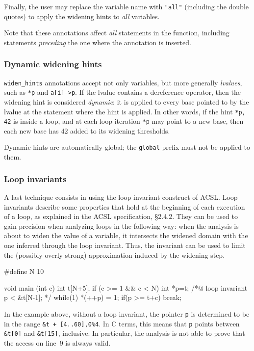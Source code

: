 \documentclass{frama-c-book}
\begin{document}
Finally, the user may replace the variable name with \lstinline|"all"|
(including the double quotes) to apply the widening hints to {\em all} variables.

Note that these annotations affect {\em all} statements in the function,
including statements {\em preceding} the one where the annotation is inserted.

\subsubsection*{Dynamic widening hints}

\lstinline|widen_hints| annotations accept not only variables, but more
generally \emph{lvalues}, such as \lstinline|*p| and \lstinline|a[i]->p|.
If the lvalue contains a dereference operator, then the widening hint is
considered \emph{dynamic}: it is applied to every base pointed to by the lvalue
at the statement where the hint is applied. In other words, if the hint
\lstinline|*p, 42| is inside a loop, and at each loop iteration \lstinline|*p|
may point to a new base, then each new base has 42 added to its widening
thresholds.

Dynamic hints are automatically global; the \lstinline|global| prefix must not
be applied to them.

\subsubsection{Loop invariants}

A last technique consists in using the loop invariant construct of ACSL.
Loop invariants describe some
properties that hold at the beginning of each execution of a loop,
as explained in the ACSL specification, \S2.4.2.
%
They can be used to gain precision when analyzing loops in
the following way: when the analysis is about to widen the value of a
variable, it intersects the widened domain with the one inferred through
the loop invariant. Thus, the invariant can be used to limit the
(possibly overly strong) approximation induced by the widening step.

\begin{listing}{1}
#define N 10

void main (int c)
{
  int t[N+5];
  if (c >= 1 && c < N)
  {
    int *p=t;
    /*@ loop invariant p < &t[N-1]; */
    while(1)
    {
      *(++p) = 1;
      if(p >= t+c)
        break;
    }
  }
}
\end{listing}
In the example above, without a loop invariant, the pointer \lstinline+p+
is determined to be in the range \lstinline|&t + [4..60],0%4|. In C terms, this
means that \lstinline+p+ points between \lstinline+&t[0]+
and \lstinline+&t[15]+, inclusive. In particular, the analysis is not able
to prove that the access on line~9 is always valid.
\end{document}
